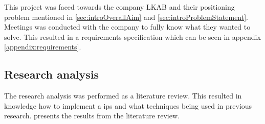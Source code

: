 \bigskip

This project was faced towards the company LKAB and their positioning problem mentioned in \cref{sec:introOverallAim} and \ref{sec:introProblemStatement}.
Meetings was conducted with the company to fully know what they wanted to solve.
This resulted in a requirements specification which can be seen in appendix \ref{appendix:requirements}.

\subsection{Research analysis}\label{sec:methodResearchAnalysis}
The research analysis was performed as a literature review. 
This resulted in knowledge how to implement a \acrshort{ips} and what techniques being used in previous research.
 presents the results from the literature review.

